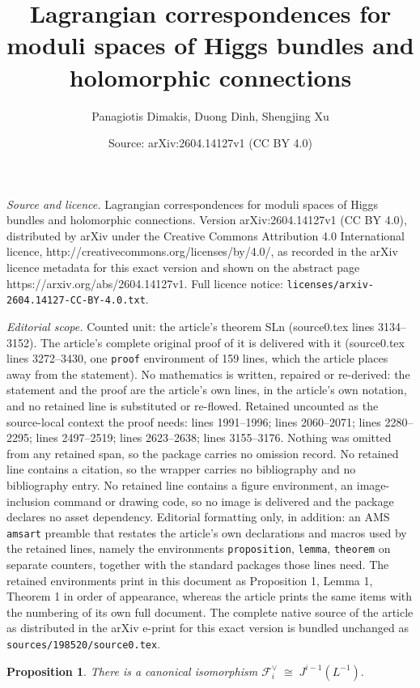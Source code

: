 \documentclass[10pt,a4paper]{amsart}
\title{Lagrangian correspondences for moduli spaces of Higgs bundles and holomorphic connections}
\author{Panagiotis Dimakis, Duong Dinh, Shengjing Xu}
\date{Source: arXiv:2604.14127v1 (CC BY 4.0)}
\newtheorem{proposition}{Proposition}
\begin{document}
\maketitle

\noindent\emph{Source and licence.} Lagrangian correspondences for moduli spaces of Higgs bundles and holomorphic connections. Version arXiv:2604.14127v1 (CC BY 4.0), distributed by arXiv under the Creative Commons Attribution 4.0 International licence, http://creativecommons.org/licenses/by/4.0/, as recorded in the arXiv licence metadata for this exact version and shown on the abstract page https://arxiv.org/abs/2604.14127v1. Full licence notice: \texttt{licenses/arxiv-2604.14127-CC-BY-4.0.txt}.\par\smallskip

\noindent\textit{Editorial scope.} Counted unit: the article's theorem SLn (source0.tex lines 3134--3152). The article's complete original proof of it is delivered with it (source0.tex lines 3272--3430, one \texttt{proof} environment of 159 lines, which the article places away from the statement). No mathematics is written, repaired or re-derived: the statement and the proof are the article's own lines, in the article's own notation, and no retained line is substituted or re-flowed.  Retained uncounted as the source-local context the proof needs: lines 1991--1996; lines 2060--2071; lines 2280--2295; lines 2497--2519; lines 2623--2638; lines 3155--3176.  Nothing was omitted from any retained span, so the package carries no omission record.  No retained line contains a citation, so the wrapper carries no bibliography and no bibliography entry.  No retained line contains a figure environment, an image-inclusion command or drawing code, so no image is delivered and the package declares no asset dependency.  Editorial formatting only, in addition: an AMS \texttt{amsart} preamble that restates the article's own declarations and macros used by the retained lines, namely the environments \texttt{proposition}, \texttt{lemma}, \texttt{theorem} on separate counters, together with the standard packages those lines need.  The retained environments print in this document as Proposition 1, Lemma 1, Theorem 1 in order of appearance, whereas the article prints the same items with the numbering of its own full document.  The complete native source of the article as distributed in the arXiv e-print for this exact version is bundled unchanged as \texttt{sources/198520/source0.tex}.
\begin{proposition}\label{p:oper bundle out D}
There is a canonical isomorphism 
\(
\mathcal F_i^\vee \;\cong\; J^{i-1}(L^{-1}).
\)
\end{proposition}
\end{document}

